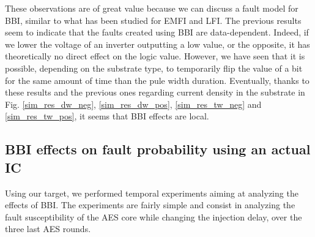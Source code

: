 	These observations are of great value because we can discuss a fault model for BBI, similar to what has been studied for EMFI and LFI.
	The previous results seem to indicate that the faults created using BBI are data-dependent.
	Indeed, if we lower the voltage of an inverter outputting a low value, or the opposite, it has theoretically no direct effect on the logic value.
	However, we have seen that it is possible, depending on the substrate type, to temporarily flip the value of a bit for the same amount of time than the pule width duration.
	Eventually, thanks to these results and the previous ones regarding current density in the substrate in Fig. \ref{sim_res_dw_neg}, \ref{sim_res_dw_pos}, \ref{sim_res_tw_neg} and \ref{sim_res_tw_pos}, it seems that BBI effects are local.

\subsection{BBI effects on fault probability using an actual IC}
	Using our target, we performed temporal experiments aiming at analyzing the effects of BBI.
	The experiments are fairly simple and consist in analyzing the fault susceptibility of the AES core while changing the injection delay, over the three last AES rounds.

